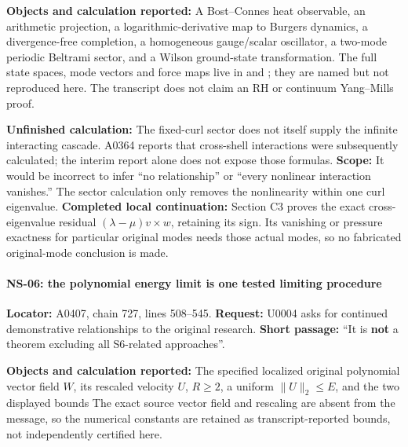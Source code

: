 \textbf{Objects and calculation reported:} A Bost--Connes heat
observable, an arithmetic projection, a logarithmic-derivative map to
Burgers dynamics, a divergence-free completion, a homogeneous
gauge/scalar oscillator, a two-mode periodic Beltrami sector, and a
Wilson ground-state transformation. The full state spaces, mode vectors
and force maps live in \protect{} and
\protect{}; they are named but not reproduced
here. The transcript does not claim an RH or continuum Yang--Mills
proof.

\textbf{Unfinished calculation:} The fixed-curl sector does not itself
supply the infinite interacting cascade. A0364 reports that cross-shell
interactions were subsequently calculated; the interim report alone does
not expose those formulas. \textbf{Scope:} It would be incorrect to
infer ``no relationship'' or ``every nonlinear interaction vanishes.''
The sector calculation only removes the nonlinearity within one curl
eigenvalue. \textbf{Completed local continuation:} Section C3 proves the
exact cross-eigenvalue residual \((\lambda-\mu)v\times w\), retaining
its sign. Its vanishing or pressure exactness for particular original
modes needs those actual modes, so no fabricated original-mode
conclusion is made.

\paragraph{NS-06: the polynomial energy limit is one tested limiting
procedure}\label{TranscriptLedgerStage:ns-06-the-polynomial-energy-limit-is-one-tested-limiting-procedure}

\textbf{Locator:} A0407, chain 727, lines 508--545. \textbf{Request:}
U0004 asks for continued demonstrative relationships to the original
research. \textbf{Short passage:} ``It is \textbf{not} a theorem
excluding all S6-related approaches''.

\textbf{Objects and calculation reported:} The specified localized
original polynomial vector field \(W\), its rescaled velocity \(U\),
\(R\ge2\), a uniform \(\|U\|_2\le E\), and the two displayed bounds
 The exact source vector field and rescaling are absent from the
message, so the numerical constants are retained as transcript-reported
bounds, not independently certified here.


